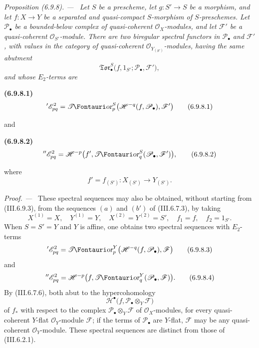 \documentclass[10pt,oneside]{book}
\newcommand{\sh}[1]{\mathscr{#1}}
\newcommand{\shTor}{\sh{T}\textup{\kern-2.2pt{\Fontauri\slshape or}}}
\newcommand{\sref}[2][]{(#2)}
\newenvironment{env}[1][]{\par\medskip\noindent\textbf{(#1)}\ }{\par}
\newenvironment{proposition}[1][]{\par\medskip\noindent\itshape Proposition (#1). ---\ }{\par}
\newenvironment{proof}{\par\medskip\noindent\textit{Proof. ---\ }}{\par}
\begin{document}
\begin{proposition}[6.9.8]
\label{III.6.9.8}
Let $S$ be a prescheme, let $g:S'\to S$ be a morphism, and let
$f:X\to Y$ be a separated and quasi-compact $S$-morphism of
$S$-preschemes.  Let $\sh P_\bullet$ be a bounded-below complex of
quasi-coherent $\sh O_X$-modules, and let $\sh F'$ be a
quasi-coherent $\sh O_{S'}$-module.  There are two biregular
spectral functors in $\sh P_\bullet$ and $\sh F'$, with values in
the category of quasi-coherent $\sh O_{Y_{(S')}}$-modules, having
the same abutment
\[
  \mathfrak{Tor}_\bullet^S
  \bigl(
    f,1_{S'};\sh P_\bullet,\sh F'
  \bigr),
\]
and whose $E_2$-terms are
\begin{env}[6.9.8.1]
\label{III.6.9.8.1}
\[
  {}'\sh E_{pq}^2
  =
  \shTor_p^S
  \bigl(
    \sh H^{-q}(f,\sh P_\bullet),\sh F'
  \bigr)
  \tag{6.9.8.1}\label{III.6.9.8.1.eq}
\]
\end{env}
and
\begin{env}[6.9.8.2]
\label{III.6.9.8.2}
\[
  {}''\sh E_{pq}^2
  =
  \sh H^{-p}
  \bigl(
    f',
    \shTor_q^S(\sh P_\bullet,\sh F')
  \bigr),
  \tag{6.9.8.2}\label{III.6.9.8.2.eq}
\]
\end{env}
where
\[
  f'=f_{(S')}:
  X_{(S')}\longrightarrow Y_{(S')}.
\]
\end{proposition}

\begin{proof}
These spectral sequences may also be obtained, without starting
from \sref{III.6.9.3}, from the sequences $(a)$ and $(b')$ of
\sref{III.6.7.3}, by taking
\[
  X^{(1)}=X,\quad
  Y^{(1)}=Y,\quad
  X^{(2)}=Y^{(2)}=S',\quad
  f_1=f,\quad
  f_2=1_{S'}.
\]
When $S=S'=Y$ and $Y$ is affine, one obtains two spectral
sequences with $E_2$-terms
\[
  {}'\sh E_{pq}^2
  =
  \shTor_p^Y
  \bigl(
    \sh H^{-q}(f,\sh P_\bullet),\sh F
  \bigr)
  \tag{6.9.8.3}\label{III.6.9.8.3}
\]
and
\[
  {}''\sh E_{pq}^2
  =
  \sh H^{-p}
  \bigl(
    f,\shTor_q^Y(\sh P_\bullet,\sh F)
  \bigr).
  \tag{6.9.8.4}\label{III.6.9.8.4}
\]
By \sref{III.6.7.6}, both abut to the hypercohomology
\[
  \sh H^\bullet
  \bigl(
    f,\sh P_\bullet\otimes_Y\sh F
  \bigr)
\]
of $f_*$ with respect to the complex
$\sh P_\bullet\otimes_Y\sh F$ of $\sh O_X$-modules, for every
quasi-coherent $Y$-flat $\sh O_Y$-module $\sh F$; if the terms of
$\sh P_\bullet$ are $Y$-flat, $\sh F$ may be any quasi-coherent
$\sh O_Y$-module.  These spectral sequences are distinct from
those of \sref{III.6.2.1}.
\end{proof}
\end{document}
